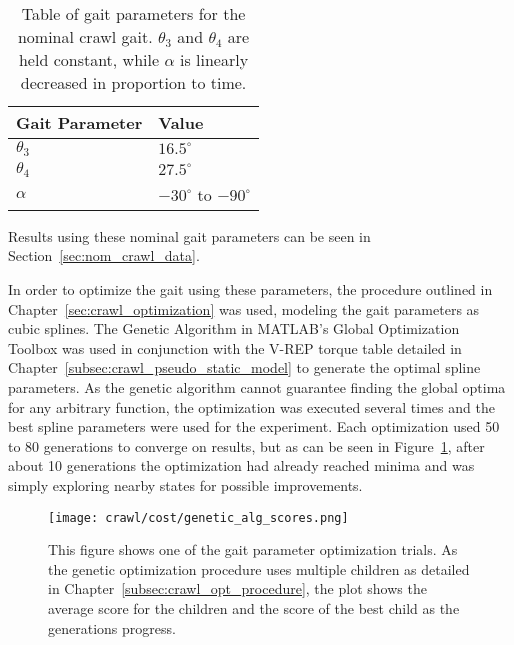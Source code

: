 \begin{table}
  \centering
  \begin{tabularx}{0.5\textwidth}{|l||X|}
    \hline
    \textbf{Gait Parameter} & \textbf{Value}                \\  \hline\hline
    $\theta_3$              &   $16.5^\circ$                \\ 
    $\theta_4$              &   $27.5^\circ$                \\  
    $\alpha$                &   $-30^\circ$ to $-90^\circ$  \\  \hline
  \end{tabularx} 
  
  \caption{Table of gait parameters for the nominal crawl gait. $\theta_3$ and $\theta_4$
           are held constant, while $\alpha$ is linearly decreased in proportion to time.}
  \label{tab:nominal_parameters}
\end{table}

Results using these nominal gait parameters can be seen in Section~\ref{sec:nom_crawl_data}.


In order to optimize the gait using these parameters, the procedure outlined in
Chapter~\ref{sec:crawl_optimization} was used, modeling the gait parameters as cubic splines.
The Genetic Algorithm in MATLAB's Global Optimization Toolbox was used in conjunction
with the V-REP torque table detailed in Chapter~\ref{subsec:crawl_pseudo_static_model}
to generate the optimal spline parameters. 
As the genetic algorithm cannot guarantee finding the global optima for any arbitrary function,
the optimization was executed several times and the best spline parameters were used
for the experiment. Each optimization used 50 to 80 generations to converge on results,
but as can be seen in Figure~\ref{fig:ga_generations}, after about 10 generations the
optimization had already reached minima and was simply exploring nearby states for possible
improvements.

\begin{figure}
  \centering
  \texttt{[image: crawl/cost/genetic\_alg\_scores.png]}
  \caption{This figure shows one of the gait parameter optimization trials.
           As the genetic optimization procedure uses multiple children as detailed in Chapter~\ref{subsec:crawl_opt_procedure}, the 
           plot shows the average score for the children and the score of the best
           child as the generations progress.}
  \label{fig:ga_generations}
\end{figure}

